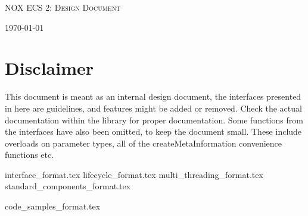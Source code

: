 \documentclass[hidelinks]{article}
\begin{document}
\begin{titlepage}
    \centering
    {\scshape\LARGE NOX ECS 2: Design Document \par}
    \vfill
    {\large \today\par}
\end{titlepage}

\tableofcontents
\pagebreak

\section{Disclaimer}
This document is meant as an internal design document,
the interfaces presented in here are guidelines, and features might be added or removed.
Check the actual documentation within the library for proper documentation.
Some functions from the interfaces have also been omitted, to keep the document small. 
These include overloads on parameter types, all of the createMetaInformation convenience functions etc.

{interface_format.tex}
\pagebreak
{lifecycle_format.tex}
\pagebreak
{multi_threading_format.tex}
\pagebreak
{standard_components_format.tex}
\pagebreak




\pagebreak
{code_samples_format.tex}
\end{document}
